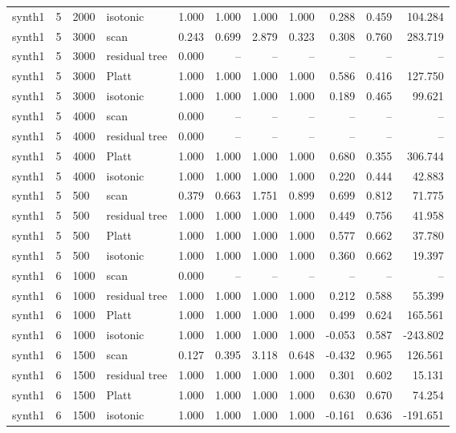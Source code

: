 \begin{tabular}{lrllrrrrrrr}
synth1 & 5 & 2000 & isotonic & 1.000 & 1.000 & 1.000 & 1.000 & 0.288 & 0.459 & 104.284 \\
synth1 & 5 & 3000 & scan & 0.243 & 0.699 & 2.879 & 0.323 & 0.308 & 0.760 & 283.719 \\
synth1 & 5 & 3000 & residual tree & 0.000 & -- & -- & -- & -- & -- & -- \\
synth1 & 5 & 3000 & Platt & 1.000 & 1.000 & 1.000 & 1.000 & 0.586 & 0.416 & 127.750 \\
synth1 & 5 & 3000 & isotonic & 1.000 & 1.000 & 1.000 & 1.000 & 0.189 & 0.465 & 99.621 \\
synth1 & 5 & 4000 & scan & 0.000 & -- & -- & -- & -- & -- & -- \\
synth1 & 5 & 4000 & residual tree & 0.000 & -- & -- & -- & -- & -- & -- \\
synth1 & 5 & 4000 & Platt & 1.000 & 1.000 & 1.000 & 1.000 & 0.680 & 0.355 & 306.744 \\
synth1 & 5 & 4000 & isotonic & 1.000 & 1.000 & 1.000 & 1.000 & 0.220 & 0.444 & 42.883 \\
synth1 & 5 & 500 & scan & 0.379 & 0.663 & 1.751 & 0.899 & 0.699 & 0.812 & 71.775 \\
synth1 & 5 & 500 & residual tree & 1.000 & 1.000 & 1.000 & 1.000 & 0.449 & 0.756 & 41.958 \\
synth1 & 5 & 500 & Platt & 1.000 & 1.000 & 1.000 & 1.000 & 0.577 & 0.662 & 37.780 \\
synth1 & 5 & 500 & isotonic & 1.000 & 1.000 & 1.000 & 1.000 & 0.360 & 0.662 & 19.397 \\
synth1 & 6 & 1000 & scan & 0.000 & -- & -- & -- & -- & -- & -- \\
synth1 & 6 & 1000 & residual tree & 1.000 & 1.000 & 1.000 & 1.000 & 0.212 & 0.588 & 55.399 \\
synth1 & 6 & 1000 & Platt & 1.000 & 1.000 & 1.000 & 1.000 & 0.499 & 0.624 & 165.561 \\
synth1 & 6 & 1000 & isotonic & 1.000 & 1.000 & 1.000 & 1.000 & -0.053 & 0.587 & -243.802 \\
synth1 & 6 & 1500 & scan & 0.127 & 0.395 & 3.118 & 0.648 & -0.432 & 0.965 & 126.561 \\
synth1 & 6 & 1500 & residual tree & 1.000 & 1.000 & 1.000 & 1.000 & 0.301 & 0.602 & 15.131 \\
synth1 & 6 & 1500 & Platt & 1.000 & 1.000 & 1.000 & 1.000 & 0.630 & 0.670 & 74.254 \\
synth1 & 6 & 1500 & isotonic & 1.000 & 1.000 & 1.000 & 1.000 & -0.161 & 0.636 & -191.651 \\

\end{tabular}

